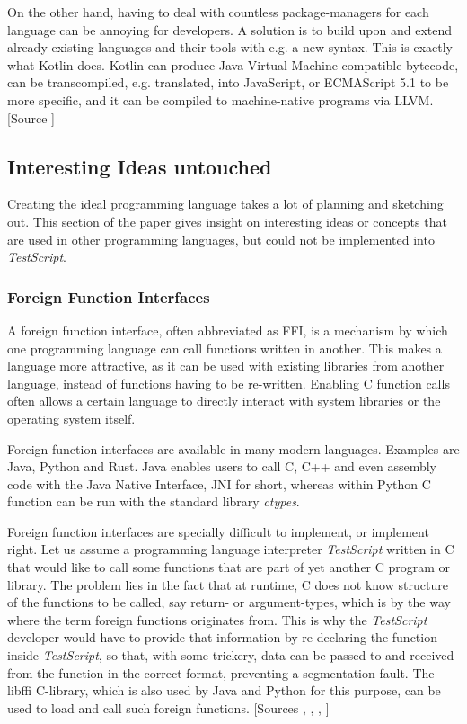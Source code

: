 \documentclass[12pt,a4paper]{article}
\newcommand{\name}{\emph{TestScript}}
\begin{document}
On the other hand, having to deal with countless package-managers for each
language can be annoying for developers. A solution is to build upon and
extend already existing languages and their tools with e.g. a new syntax.
This is exactly what Kotlin does. Kotlin can produce Java Virtual Machine
compatible bytecode, can be transcompiled, e.g. translated, into
JavaScript, or ECMAScript 5.1 to be more specific,
and it can be compiled to machine-native programs via LLVM. 
[Source ]

\subsection{Interesting Ideas untouched}
Creating the ideal programming language takes a lot of planning and sketching
out. This section of the paper gives insight on interesting ideas or concepts
that are used in other programming languages, but 
could not be implemented into \name{}.

\subsubsection{Foreign Function Interfaces}
A foreign function interface, often abbreviated as FFI,
is a mechanism by which one programming language can call functions written 
in another. This makes a language more attractive, as it can be used with
existing libraries from another language, instead of functions having to be
re-written. Enabling C function calls often allows a certain language to
directly interact with system libraries or the operating system itself.

Foreign function interfaces are available in many modern languages.
Examples are Java, Python and Rust.
Java enables users to call C, C++ and even assembly code with the Java Native
Interface, JNI for short, whereas within Python C function can
be run with the standard library \emph{ctypes}.

Foreign function interfaces are specially difficult to implement, or implement
right. Let us assume a programming language interpreter \name{} written in C that
would like to call some functions that are part of yet another C program or
library. The problem lies in the fact that at runtime, C does not know
structure of the functions to be called, say return- or argument-types, which
is by the way where the term foreign functions originates from. This is why the
\name{} developer would have to provide that information by re-declaring the
function inside \name{}, so that, with some trickery, data can be passed to and
received from the function in the correct format, preventing a segmentation
fault. The libffi C-library, which is also used by Java and
Python for this purpose, can be used to load and call such foreign functions.
[Sources , , , ]
\end{document}
